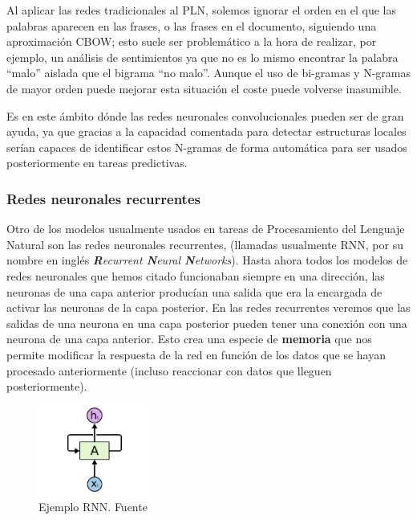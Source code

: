 Al aplicar las redes tradicionales al PLN, solemos ignorar el orden en el que las palabras aparecen en las frases, o las frases en el documento, siguiendo una aproximación CBOW;  esto suele ser problemático a la hora de realizar, por ejemplo, un análisis de sentimientos ya que no es lo mismo encontrar la palabra ``malo'' aislada que el bigrama ``no malo''. Aunque el uso de bi-gramas y N-gramas de mayor orden puede mejorar esta situación el coste puede volverse inasumible. 

Es en este ámbito dónde las redes neuronales convolucionales pueden ser de gran ayuda, ya que gracias a la capacidad comentada para detectar estructuras locales serían capaces de identificar estos N-gramas de forma automática para ser usados posteriormente en tareas predictivas. 




\subsubsection{Redes neuronales recurrentes}
Otro de los modelos usualmente usados en tareas de Procesamiento del Lenguaje Natural son las redes neuronales recurrentes, (llamadas usualmente RNN, por su nombre en inglés \textit{\textbf{R}ecurrent \textbf{N}eural \textbf{N}etworks}). Hasta ahora todos los modelos de redes neuronales que hemos citado funcionaban siempre en una dirección, las neuronas de una capa anterior producían una salida que era la encargada de activar las neuronas de la capa posterior. En las redes recurrentes veremos que las salidas de una neurona en una capa posterior pueden tener una conexión con una neurona de una capa anterior. Esto crea una especie de \textbf{memoria} que nos permite modificar la respuesta de la red en función de los datos que se hayan procesado anteriormente (incluso reaccionar con datos que lleguen posteriormente).

\begin{figure}[!ht]
	\centering
	\includegraphics[width=0.32\textwidth]{images/arte/rnn}
	\caption{Ejemplo RNN. Fuente \cite{colahblog}}
	\label{fig:rnn}
\end{figure}

